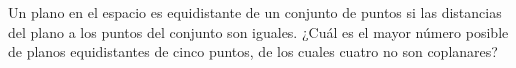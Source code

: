 Un plano en el espacio es equidistante de un conjunto de puntos si las distancias del plano a los puntos del conjunto son iguales. ¿Cuál es el mayor número posible de planos equidistantes de cinco puntos, de los cuales cuatro no son coplanares? 